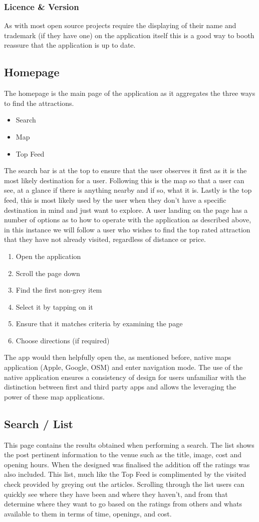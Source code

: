 \documentclass{article}
\begin{document}
\subsubsection{Licence \& Version}
As with most open source projects require the displaying of their name and trademark (if they have one) on the application itself this is a good way to booth reassure that the application is up to date.
\subsection{Homepage}
The homepage is the main page of the application as it aggregates the three ways to find the attractions.
\begin{itemize}
	\item Search
	\item Map
	\item Top Feed
\end{itemize}
The search bar is at the top to ensure that the user observes it first as it is the most likely destination for a user.
Following this is the map so that a user can see, at a glance if there is anything nearby and if so, what it is.
Lastly is the top feed, this is most likely used by the user when they don't have a specific destination in mind and just want to explore.
A user landing on the page has a number of options as to how to operate with the application as described above, in this instance we will follow a user who wishes to find the top rated attraction that they have not already visited, regardless of distance or price.
\begin{enumerate}
	\item Open the application
	\item Scroll the page down
	\item Find the first non-grey item
	\item Select it by tapping on it
	\item Ensure that it matches criteria by examining the page
	\item Choose directions (if required)
\end{enumerate}
The app would then helpfully open the, as mentioned before, native maps application (Apple, Google, OSM) and enter navigation mode.
The use of the native application ensures a consistency of design for users unfamiliar with the distinction between first and third party apps and allows the leveraging the power of these map applications.
\subsection{Search / List}
This page contains the results obtained when performing a search.
The list shows the post pertinent information to the venue such as the title, image, cost and opening hours.
When the designed was finalised the addition off the ratings was also included.
This list, much like the Top Feed is complimented by the visited check provided by greying out the articles.
Scrolling through the list users can quickly see where they have been and where they haven't, and from that determine where they want to go based on the ratings from others and whats available to them in terms of time, openings, and cost.
\end{document}
